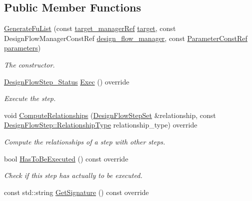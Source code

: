 \subsection*{Public Member Functions}
\begin{DoxyCompactItemize}
\item 
\hyperlink{classGenerateFuList_ac027f6e5f51f33b7bb3b673ec414e4f6}{Generate\+Fu\+List} (const \hyperlink{target__manager_8hpp_aee0b586a84fb6eb4faefa6e41e1735a9}{target\+\_\+manager\+Ref} \hyperlink{classFunctionalUnitStep_a1f90bc8bd6531c4cdf67966734a66cea}{target}, const Design\+Flow\+Manager\+Const\+Ref \hyperlink{classDesignFlowStep_ab770677ddf087613add30024e16a5554}{design\+\_\+flow\+\_\+manager}, const \hyperlink{Parameter_8hpp_a37841774a6fcb479b597fdf8955eb4ea}{Parameter\+Const\+Ref} \hyperlink{classDesignFlowStep_a802eaafe8013df706370679d1a436949}{parameters})
\begin{DoxyCompactList}\small\item\em The constructor. \end{DoxyCompactList}\item 
\hyperlink{design__flow__step_8hpp_afb1f0d73069c26076b8d31dbc8ebecdf}{Design\+Flow\+Step\+\_\+\+Status} \hyperlink{classGenerateFuList_adadbe6658c33d77bb24fd0e8b1516a65}{Exec} () override
\begin{DoxyCompactList}\small\item\em Execute the step. \end{DoxyCompactList}\item 
void \hyperlink{classGenerateFuList_a3651813235effdc39f39dd064571a135}{Compute\+Relationships} (\hyperlink{classDesignFlowStepSet}{Design\+Flow\+Step\+Set} \&relationship, const \hyperlink{classDesignFlowStep_a723a3baf19ff2ceb77bc13e099d0b1b7}{Design\+Flow\+Step\+::\+Relationship\+Type} relationship\+\_\+type) override
\begin{DoxyCompactList}\small\item\em Compute the relationships of a step with other steps. \end{DoxyCompactList}\item 
bool \hyperlink{classGenerateFuList_ae5f29f70bd0b315ffa9369fc93fa5096}{Has\+To\+Be\+Executed} () const override
\begin{DoxyCompactList}\small\item\em Check if this step has actually to be executed. \end{DoxyCompactList}\item 
const std\+::string \hyperlink{classGenerateFuList_a7bd13ddbc7a4b82d834a9cd0812d4b90}{Get\+Signature} () const override

\end{DoxyCompactItemize}
